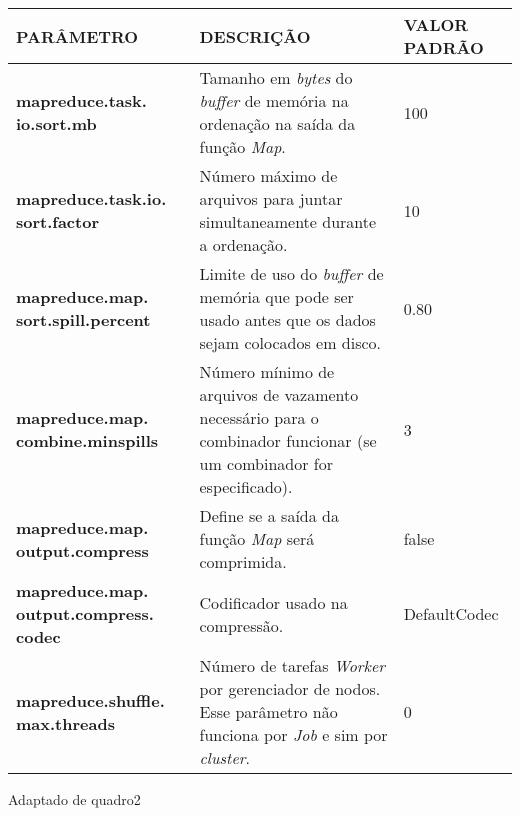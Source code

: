 {\footnotesize
  \centering
  \begin{tabular}{|p{30mm}|p{50mm}|p{35mm}|}\hline
    \textbf{PARÂMETRO}                             & \textbf{DESCRIÇÃO}                                                                                                                   & \textbf{VALOR PADRÃO} \\\hline
    \textbf{mapreduce.task. io.sort.mb}            & Tamanho em \textit{\gls{byte}s} do \textit{\gls{buffer}} de memória na ordenação na saída da função \textit{Map}.                          & 100                   \\\hline
    \textbf{mapreduce.task.io. sort.factor}        & Número máximo de arquivos para juntar simultaneamente durante a ordenação.                                                           & 10                    \\\hline
    \textbf{mapreduce.map. sort.spill.percent}     & Limite de uso do \textit{\gls{buffer}} de memória que pode ser usado antes que os dados sejam colocados em disco.                          & 0.80                  \\\hline
    \textbf{mapreduce.map. combine.minspills}      & Número mínimo de arquivos de vazamento necessário para o combinador funcionar (se um combinador for especificado).                   & 3                     \\\hline
    \textbf{mapreduce.map. output.compress}        & Define se a saída da função \textit{Map} será comprimida.                                                                            & false                 \\\hline
    \textbf{mapreduce.map. output.compress. codec} & Codificador usado na compressão.                                                                                                     & DefaultCodec          \\\hline
    \textbf{mapreduce.shuffle. max.threads}        & Número de tarefas \textit{Worker} por gerenciador de nodos. Esse parâmetro não funciona por \textit{Job} e sim por \textit{cluster}. & 0                     \\\hline
  \end{tabular}}
{Adaptado de \cite{HadoopDocs321}}{quadro2}{}{}


